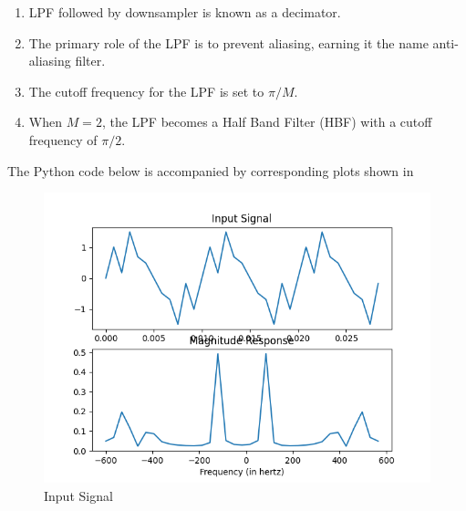 \documentclass{article}
\begin{document}
\begin{enumerate}
    \item LPF followed by downsampler is known as a decimator.
    \item The primary role of the LPF is to prevent aliasing, earning it the name anti-aliasing filter.
    \item The cutoff frequency for the LPF is set to \(\pi/M\).
    \item When \(M = 2\), the LPF becomes a Half Band Filter (HBF) with a cutoff frequency of \(\pi/2\).
\end{enumerate}
The Python code below is accompanied by corresponding plots shown in
\begin{center}
\end{center}

\begin{figure}[ht]
  \centering
  \includegraphics[scale=0.5]{./dsp/figs/d_input.png}
  \caption{ Input Signal}
  \label{fig:d_input}
\end{figure}
\end{document}
